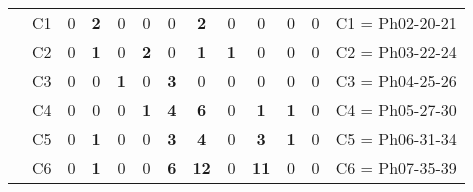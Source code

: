 \begin{table}[H]
{\begin{tabular}{|ccrrrrrrrrrrc|}
\multicolumn{1}{|c|}{}                                      & \multicolumn{1}{c|}{C1} & \multicolumn{1}{c|}{0}  & \multicolumn{1}{c|}{\textbf{2}} & \multicolumn{1}{c|}{0}          & \multicolumn{1}{c|}{0}          & \multicolumn{1}{c|}{0}          & \multicolumn{1}{c|}{\textbf{2}}  & \multicolumn{1}{c|}{0}          & \multicolumn{1}{c|}{0}           & \multicolumn{1}{c|}{0}          & \multicolumn{1}{c|}{0}          & C1 = Ph02-20-21   \\ \cline{2-13}
\multicolumn{1}{|c|}{}                                      & \multicolumn{1}{c|}{C2} & \multicolumn{1}{c|}{0}  & \multicolumn{1}{c|}{\textbf{1}} & \multicolumn{1}{c|}{0}          & \multicolumn{1}{c|}{\textbf{2}} & \multicolumn{1}{c|}{0}          & \multicolumn{1}{c|}{\textbf{1}}  & \multicolumn{1}{c|}{\textbf{1}} & \multicolumn{1}{c|}{0}           & \multicolumn{1}{c|}{0}          & \multicolumn{1}{c|}{0}          & C2 = Ph03-22-24   \\ \cline{2-13}
\multicolumn{1}{|c|}{}                                      & \multicolumn{1}{c|}{C3} & \multicolumn{1}{c|}{0}  & \multicolumn{1}{c|}{0}          & \multicolumn{1}{c|}{\textbf{1}} & \multicolumn{1}{c|}{0}          & \multicolumn{1}{c|}{\textbf{3}} & \multicolumn{1}{c|}{0}           & \multicolumn{1}{c|}{0}          & \multicolumn{1}{c|}{0}           & \multicolumn{1}{c|}{0}          & \multicolumn{1}{c|}{0}          & C3 = Ph04-25-26   \\ \cline{2-13}
\multicolumn{1}{|c|}{}                                      & \multicolumn{1}{c|}{C4} & \multicolumn{1}{c|}{0}  & \multicolumn{1}{c|}{0}          & \multicolumn{1}{c|}{0}          & \multicolumn{1}{c|}{\textbf{1}} & \multicolumn{1}{c|}{\textbf{4}} & \multicolumn{1}{c|}{\textbf{6}}  & \multicolumn{1}{c|}{0}          & \multicolumn{1}{c|}{\textbf{1}}  & \multicolumn{1}{c|}{\textbf{1}} & \multicolumn{1}{c|}{0}          & C4 = Ph05-27-30   \\ \cline{2-13}
\multicolumn{1}{|c|}{}                                      & \multicolumn{1}{c|}{C5} & \multicolumn{1}{c|}{0}  & \multicolumn{1}{c|}{\textbf{1}} & \multicolumn{1}{c|}{0}          & \multicolumn{1}{c|}{0}          & \multicolumn{1}{c|}{\textbf{3}} & \multicolumn{1}{c|}{\textbf{4}}  & \multicolumn{1}{c|}{0}          & \multicolumn{1}{c|}{\textbf{3}}  & \multicolumn{1}{c|}{\textbf{1}} & \multicolumn{1}{c|}{0}          & C5 = Ph06-31-34   \\ \cline{2-13}
\multicolumn{1}{|c|}{}                                      & \multicolumn{1}{c|}{C6} & \multicolumn{1}{c|}{0}  & \multicolumn{1}{c|}{\textbf{1}} & \multicolumn{1}{c|}{0}          & \multicolumn{1}{c|}{0}          & \multicolumn{1}{c|}{\textbf{6}} & \multicolumn{1}{c|}{\textbf{12}} & \multicolumn{1}{c|}{0}          & \multicolumn{1}{c|}{\textbf{11}} & \multicolumn{1}{c|}{0}          & \multicolumn{1}{c|}{0}          & C6 = Ph07-35-39   \\ \cline{2-13}

\end{tabular}}
\end{table}

